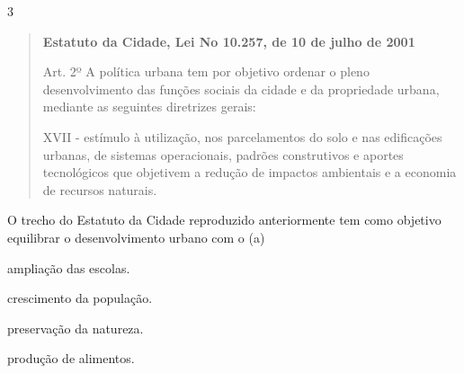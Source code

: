 \num{3}

\begin{quote}
\textbf{Estatuto da Cidade, Lei No 10.257, de 10 de julho de 2001}

Art. 2º A política urbana tem por objetivo
ordenar o pleno desenvolvimento das funções sociais da cidade e da
propriedade urbana, mediante as seguintes diretrizes gerais:

XVII - estímulo à utilização, nos parcelamentos do solo e nas
edificações urbanas, de sistemas operacionais, padrões construtivos e
aportes tecnológicos que objetivem a redução de impactos ambientais e a
economia de recursos naturais.

\end{quote}

O trecho do Estatuto da Cidade reproduzido anteriormente tem como objetivo
equilibrar o desenvolvimento urbano com o (a)

\begin{minipage}{.5\textwidth}
\begin{escolha}
\item ampliação das escolas.

\item crescimento da população.

\item preservação da natureza.

\item produção de alimentos.
\end{escolha}
\end{minipage}


